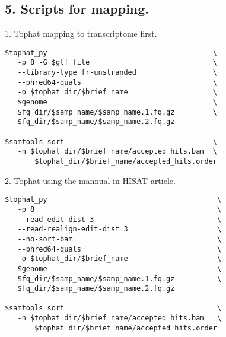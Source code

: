 \subsection{5. Scripts for mapping.}
\begin{frame}[c,fragile]
	\begin{block}{ 1. Tophat mapping to transcriptome first. }
		\begin{lstlisting}[basicstyle=\tiny]
$tophat_py                                       \
   -p 8 -G $gtf_file                             \
   --library-type fr-unstranded                  \    
   --phred64-quals                               \
   -o $tophat_dir/$brief_name                    \
   $genome                                       \
   $fq_dir/$samp_name/$samp_name.1.fq.gz         \
   $fq_dir/$samp_name/$samp_name.2.fq.gz

$samtools sort                                   \
   -n $tophat_dir/$brief_name/accepted_hits.bam  \
	   $tophat_dir/$brief_name/accepted_hits.order
		\end{lstlisting}
	\end{block}
\end{frame}

\begin{frame}[c,fragile]
	\begin{block}{ 2. Tophat using the mannual in HISAT article. }
		\begin{lstlisting}[basicstyle=\tiny]
$tophat_py                                        \
   -p 8                                           \
   --read-edit-dist 3                             \
   --read-realign-edit-dist 3                     \
   --no-sort-bam                                  \
   --phred64-quals                                \
   -o $tophat_dir/$brief_name                     \
   $genome                                        \
   $fq_dir/$samp_name/$samp_name.1.fq.gz          \
   $fq_dir/$samp_name/$samp_name.2.fq.gz

$samtools sort                                    \
   -n $tophat_dir/$brief_name/accepted_hits.bam   \
	   $tophat_dir/$brief_name/accepted_hits.order
		\end{lstlisting}
	\end{block}
\end{frame}

